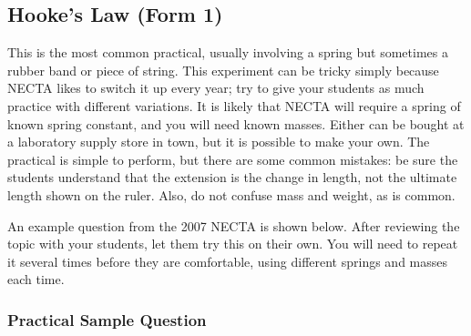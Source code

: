\subsection{Hooke’s Law (Form 1)}

This is the most common practical, usually involving a spring but sometimes a
rubber band or piece of string. This experiment can be tricky simply because NECTA
likes to switch it up every year; try to give your students as much practice with different
variations. It is likely that NECTA will require a spring of known spring constant, and
you will need known masses. Either can be bought at a laboratory supply store in town,
but it is possible to make your own. The practical is simple to perform, but there are
some common mistakes: be sure the students understand that the extension is the change
in length, not the ultimate length shown on the ruler. Also, do not confuse mass and
weight, as is common.

An example question from the 2007 NECTA is shown below. After reviewing
the topic with your students, let them try this on their own. You will need to repeat it
several times before they are comfortable, using different springs and masses each time.

\subsubsection{Practical Sample Question}

